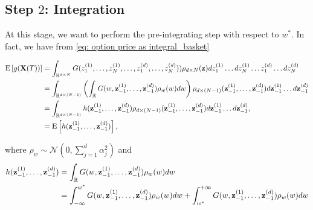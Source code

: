 \subsection{Step $2$: Integration}


At this stage, we want to perform the pre-integrating step with respect to  $w^\ast$. In fact, we have from \eqref{eq: option price as integral_basket}
\begin{small}
\begin{align}\label{eq: pre_integration_step_wrt_y1_basket}
	\mathrm{E}\left[g(\mathbf{X}(T))\right]&=\int_{\mathbb{R}^{d \times N}} G(z_1^{(1)}, \dots, z_N^{(1)}, \dots, z_1^{(d)},\dots,z^{(d)}_N)) \rho_{d \times N}(\mathbf{z}) dz_1^{(1)} \dots dz_N^{(1)} \dots z_1^{(d)} \dots dz^{(d)}_N \nonumber\\ 
	&=\int_{\mathbb{R}^{d \times (N-1)}} \left(\int_{\mathbb{R}} G(w,\mathbf{z}^{(1)}_{-1},\dots,\mathbf{z}^{(d)}_{-1} ) \rho_w(w) dw \right) \rho_{d \times(N-1)}(\mathbf{z}_{-1}^{(1)},\dots,\mathbf{z}_{-1}^{(d)}) d\mathbf{z}_{-1}^{(1)}\dots d\mathbf{z}_{-1}^{(d)}\nonumber\\	
	&=\int_{\mathbb{R}^{d\times (N-1)}} h(\mathbf{z}^{(1)}_{-1},\dots,\mathbf{z}^{(d)}_{-1} ) \rho_{d\times (N-1)}(\mathbf{z}_{-1}^{(1)},\dots,\mathbf{z}_{-1}^{(d)}) d\mathbf{z}^{(1)}_{-1} \dots d\mathbf{z}^{(d)}_{-1}, \\ \nonumber
	&=\mathrm{E}\left[h(\mathbf{z}^{(1)}_{-1},\dots,\mathbf{z}^{(d)}_{-1} )\right] ,
\end{align}
\end{small}
where $\rho_w \sim \mathcal{N}(0,\sum_{j=1}^d \alpha_j^2)$ and
\begin{align}
 h(\mathbf{z}^{(1)}_{-1},\dots,\mathbf{z}^{(d)}_{-1})&=\int_{\mathbb{R}} G(w,\mathbf{z}^{(1)}_{-1},\dots,\mathbf{z}^{(d)}_{-1} ) \rho_w(w) dw \nonumber\\
 &= \int_{-\infty}^{w^\ast} G(w,\mathbf{z}^{(1)}_{-1},\dots,\mathbf{z}^{(d)}_{-1} ) \rho_w(w) dw+ \int_{w^\ast}^{+\infty} G(w,\mathbf{z}^{(1)}_{-1},\dots,\mathbf{z}^{(d)}_{-1} ) \rho_w(w) dw
\end{align}

